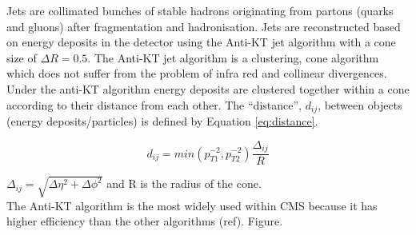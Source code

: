 Jets are collimated bunches of stable hadrons originating from partons (quarks
and gluons) after fragmentation and hadronisation. Jets are reconstructed based 
on energy deposits in the detector using the Anti-KT jet algorithm with a cone 
size of $\Delta R = 0.5$. The Anti-KT jet algorithm is a clustering, cone 
algorithm which does not suffer from the problem of infra red and collinear 
divergences. \\

Under the anti-KT algorithm energy deposits are clustered together within a cone
according to their distance from each other. The ``distance'', $d_{ij}$, between 
objects (energy deposits/particles) is defined by Equation \ref{eq:distance}.

\begin{equation}
d_{ij} = min(p_{T1}^{-2}, p_{T2}^{-2})\frac{\Delta_{ij}}{R}
\label{eq:distance}
\end{equation}

$\Delta_{ij} = \sqrt{\Delta \eta^{2} + \Delta \phi^{2}}$ and R is the radius of
the cone. \\

The Anti-KT algorithm is the most widely used within CMS because it has higher 
efficiency than the other algorithms (ref). Figure. \\


